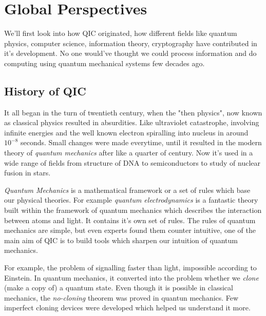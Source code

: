 \section{Global Perspectives}
We'll first look into how QIC originated, how different fields like quantum physics, computer science, information theory, cryptography have contributed in it's development. No one would've thought we could process information and do computing using quantum mechanical systems few decades ago.
\subsection{History of QIC}
It all began in the turn of twentieth century, when the "then physics", now known as classical physics resulted in absurdities. Like ultraviolet catastrophe, involving infinite energies and the well known electron spiralling into nucleus in around $10^{-8}$ seconds. Small changes were made everytime, until it resulted in the modern theory of \textit{quantum mechanics} after like a quarter of century. Now it's used in a wide range of fields from structure of DNA to semiconductors to study of nuclear fusion in stars.

\textit{Quantum Mechanics} is a mathematical framework or a set of rules which base our physical theories. For example \textit{quantum electrodynamics} is a fantastic theory built within the framework of quantum mechanics which describes the interaction between atoms and light. It contains it's own set of rules. The rules of quantum mechanics are simple, but even experts found them counter intuitive, one of the main aim of QIC is to build tools which sharpen our intuition of quantum mechanics.

For example, the problem of signalling faster than light, impossible according to Einstein. In quantum mechanics, it converted into the problem whether we \textit{clone} (make a copy of) a quantum state. Even though it is possible in classical mechanics, the \textit{no-cloning} theorem was proved in quantun mechanics. Few imperfect cloning devices were developed which helped us understand it more.

